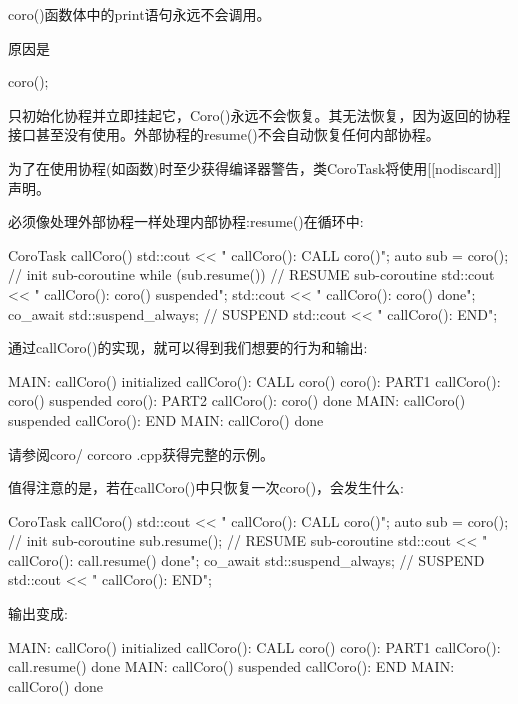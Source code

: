coro()函数体中的print语句永远不会调用。

原因是

\begin{cpp}
coro();
\end{cpp}

只初始化协程并立即挂起它，Coro()永远不会恢复。其无法恢复，因为返回的协程接口甚至没有使用。外部协程的resume()不会自动恢复任何内部协程。

为了在使用协程(如函数)时至少获得编译器警告，类CoroTask将使用[[nodiscard]]声明。


必须像处理外部协程一样处理内部协程:resume()在循环中:

\begin{cpp}
CoroTask callCoro()
{
	std::cout << " callCoro(): CALL coro()\n";
	auto sub = coro(); // init sub-coroutine
	while (sub.resume()) { // RESUME sub-coroutine
		std::cout << " callCoro(): coro() suspended\n";
	}
	std::cout << " callCoro(): coro() done\n";
	co_await std::suspend_always{}; // SUSPEND
	std::cout << " callCoro(): END\n";
}
\end{cpp}

通过callCoro()的实现，就可以得到我们想要的行为和输出:

\begin{shell}
MAIN: callCoro() initialized
  callCoro(): CALL coro()
    coro(): PART1
  callCoro(): coro() suspended
    coro(): PART2
  callCoro(): coro() done
MAIN: callCoro() suspended
  callCoro(): END
MAIN: callCoro() done
\end{shell}

请参阅coro/ corcoro .cpp获得完整的示例。


值得注意的是，若在callCoro()中只恢复一次coro()，会发生什么:

\begin{cpp}
CoroTask callCoro()
{
	std::cout << " callCoro(): CALL coro()\n";
	auto sub = coro(); // init sub-coroutine
	sub.resume(); // RESUME sub-coroutine
	std::cout << " callCoro(): call.resume() done\n";
	co_await std::suspend_always{}; // SUSPEND
	std::cout << " callCoro(): END\n";
}
\end{cpp}

输出变成:

\begin{shell}
MAIN: callCoro() initialized
  callCoro(): CALL coro()
    coro(): PART1
  callCoro(): call.resume() done
MAIN: callCoro() suspended
  callCoro(): END
MAIN: callCoro() done
\end{shell}

